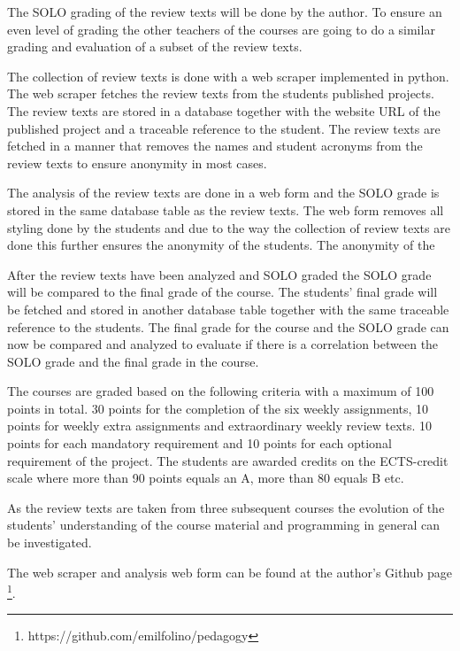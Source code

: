 \documentclass[twoside,twocolumn,a4paper,11pt,english]{article}
\begin{document}
The SOLO grading of the review texts will be done by the author. To ensure an even level of grading the other teachers of the courses are going to do a similar grading and evaluation of a subset of the review texts.

The collection of review texts is done with a web scraper implemented in python. The web scraper fetches the review texts from the students published projects. The review texts are stored in a database together with the website URL of the published project and a traceable reference to the student. The review texts are fetched in a manner that removes the names and student acronyms from the review texts to ensure anonymity in most cases.

The analysis of the review texts are done in a web form and the SOLO grade is stored in the same database table as the review texts. The web form removes all styling done by the students and due to the way the collection of review texts are done this further ensures the anonymity of the students. The anonymity of the

After the review texts have been analyzed and SOLO graded the SOLO grade will be compared to the final grade of the course. The students' final grade will be fetched and stored in another database table together with the same traceable reference to the students. The final grade for the course and the SOLO grade can now be compared and analyzed to evaluate if there is a correlation between the SOLO grade and the final grade in the course.

The courses are graded based on the following criteria with a maximum of 100 points in total. 30 points for the completion of the six weekly assignments, 10 points for weekly extra assignments and extraordinary weekly review texts. 10 points for each mandatory requirement and 10 points for each optional requirement of the project. The students are awarded credits on the ECTS-credit scale where more than 90 points equals an A, more than 80 equals B etc.

As the review texts are taken from three subsequent courses the evolution of the students' understanding of the course material and programming in general can be investigated.

The web scraper and analysis web form can be found at the author's Github page \footnote{https://github.com/emilfolino/pedagogy}.



\end{document}
